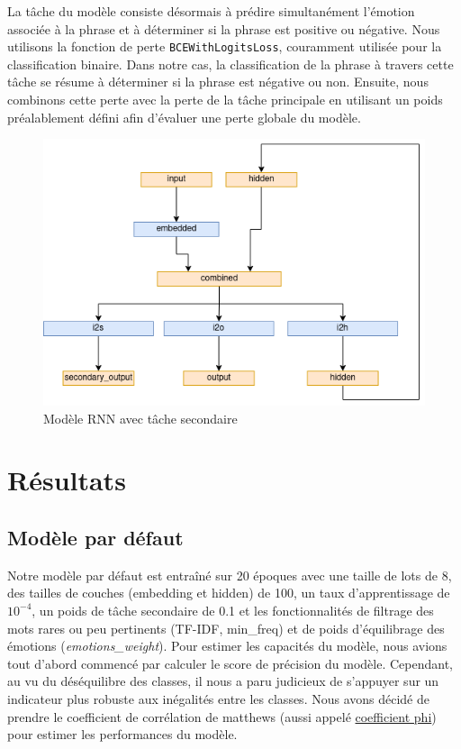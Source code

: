 \documentclass{article}
\begin{document}
La tâche du modèle consiste désormais à prédire simultanément l'émotion associée à la phrase et à déterminer si la phrase est positive ou négative. Nous utilisons la fonction de perte \texttt{BCEWithLogitsLoss}, couramment utilisée pour la classification binaire. Dans notre cas, la classification de la phrase à travers cette tâche se résume à déterminer si la phrase est négative ou non. Ensuite, nous combinons cette perte avec la perte de la tâche principale en utilisant un poids préalablement défini afin d'évaluer une perte globale du modèle.

\begin{figure}[H]
    \centering
    \includegraphics[width=0.5\linewidth]{img/modele_with_secondary.png}
    \caption{Modèle RNN avec tâche secondaire}

    \label{fig:modele_rnn_with_secondary}
\end{figure}

\section{Résultats}

\subsection{Modèle par défaut}
Notre modèle par défaut est entraîné sur 20 époques avec une taille de lots de 8, des tailles de couches (embedding et hidden) de 100, un taux d'apprentissage de $10^{-4}$, un poids de tâche secondaire de 0.1 et les fonctionnalités de filtrage des mots rares ou peu pertinents (TF-IDF, min\_freq) et de poids d'équilibrage des émotions (\textit{emotions\_weight}).
Pour estimer les capacités du modèle, nous avions tout d'abord commencé par calculer le score de précision du modèle.
Cependant, au vu du déséquilibre des classes, il nous a paru judicieux de s'appuyer sur un indicateur plus robuste aux inégalités entre les classes.
Nous avons décidé de prendre le coefficient de corrélation de matthews (aussi appelé \href{https://en.wikipedia.org/wiki/Phi_coefficient}{coefficient phi}) pour estimer les performances du modèle.
\end{document}
